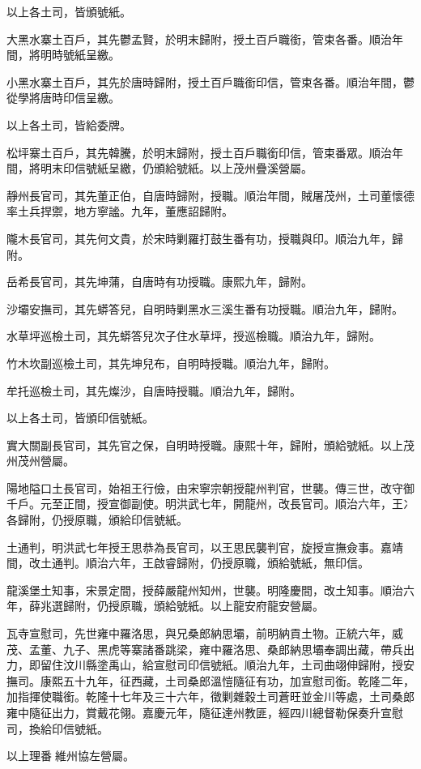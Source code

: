 \begin{pinyinscope}
以上各土司，皆頒號紙。

大黑水寨土百戶，其先鬱孟賢，於明末歸附，授土百戶職銜，管束各番。順治年間，將明時號紙呈繳。

小黑水寨土百戶，其先於唐時歸附，授土百戶職銜印信，管束各番。順治年間，鬱從學將唐時印信呈繳。

以上各土司，皆給委牌。

松坪寨土百戶，其先韓騰，於明末歸附，授土百戶職銜印信，管束番眾。順治年間，將明末印信號紙呈繳，仍頒給號紙。以上茂州疊溪營屬。

靜州長官司，其先董正伯，自唐時歸附，授職。順治年間，賊屠茂州，土司董懷德率土兵捍禦，地方寧謐。九年，董應詔歸附。

隴木長官司，其先何文貴，於宋時剿羅打鼓生番有功，授職與印。順治九年，歸附。

岳希長官司，其先坤蒲，自唐時有功授職。康熙九年，歸附。

沙壩安撫司，其先蟒答兒，自明時剿黑水三溪生番有功授職。順治九年，歸附。

水草坪巡檢土司，其先蟒答兒次子住水草坪，授巡檢職。順治九年，歸附。

竹木坎副巡檢土司，其先坤兒布，自明時授職。順治九年，歸附。

牟托巡檢土司，其先燦沙，自唐時授職。順治九年，歸附。

以上各土司，皆頒印信號紙。

實大關副長官司，其先官之保，自明時授職。康熙十年，歸附，頒給號紙。以上茂州茂州營屬。

陽地隘口土長官司，始祖王行儉，由宋寧宗朝授龍州判官，世襲。傳三世，改守御千戶。元至正間，授宣御副使。明洪武七年，開龍州，改長官司。順治六年，王⼎各歸附，仍授原職，頒給印信號紙。

土通判，明洪武七年授王思恭為長官司，以王思民襲判官，旋授宣撫僉事。嘉靖間，改土通判。順治六年，王啟睿歸附，仍授原職，頒給號紙，無印信。

龍溪堡土知事，宋景定間，授薛嚴龍州知州，世襲。明隆慶間，改土知事。順治六年，薛兆選歸附，仍授原職，頒給號紙。以上龍安府龍安營屬。

瓦寺宣慰司，先世雍中羅洛思，與兄桑郎納思壩，前明納貢土物。正統六年，威茂、孟董、九子、黑虎等寨諸番跳梁，雍中羅洛思、桑郎納思壩奉調出藏，帶兵出力，即留住汶川縣塗禹山，給宣慰司印信號紙。順治九年，土司曲翊伸歸附，授安撫司。康熙五十九年，征西藏，土司桑郎溫愷隨征有功，加宣慰司銜。乾隆二年，加指揮使職銜。乾隆十七年及三十六年，徵剿雜穀土司蒼旺並金川等處，土司桑郎雍中隨征出力，賞戴花翎。嘉慶元年，隨征達州教匪，經四川總督勒保奏升宣慰司，換給印信號紙。

以上理番維州協左營屬。


\end{pinyinscope}
